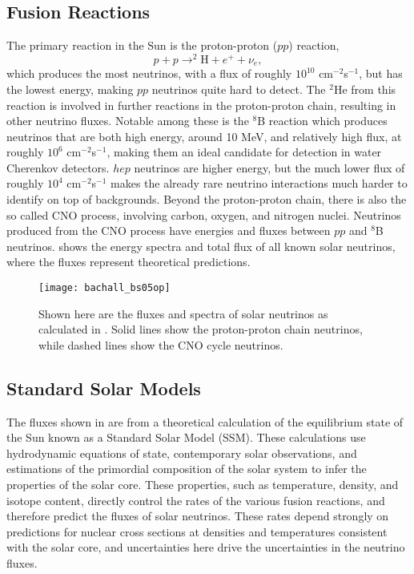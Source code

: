 \subsection{Fusion Reactions}

The primary reaction in the Sun is the proton-proton ($pp$) reaction,
\begin{equation}
p+p \rightarrow ^2\mathrm{H}+e^++\nu_e,
\end{equation}
which produces the most neutrinos, with a flux of roughly $10^10$ cm$^{-2}$s$^{-1}$, but has the lowest energy, making $pp$ neutrinos quite hard to detect.
The $^2$He from this reaction is involved in further reactions in the proton-proton chain, resulting in other neutrino fluxes.
Notable among these is the $^8$B reaction which produces neutrinos that are both high energy, around 10 MeV, and relatively high flux, at roughly $10^6$ cm$^{-2}$s$^{-1}$, making them an ideal candidate for detection in water Cherenkov detectors.
$hep$ neutrinos are higher energy, but the much lower flux of roughly $10^4$ cm$^{-2}$s$^{-1}$ makes the already rare neutrino interactions much harder to identify on top of backgrounds.
Beyond the proton-proton chain, there is also the so called CNO process, involving carbon, oxygen, and nitrogen nuclei. 
Neutrinos produced from the CNO process have energies and fluxes between $pp$ and $^8$B neutrinos.
 shows the energy spectra and total flux of all known solar neutrinos, where the fluxes represent theoretical predictions.

\begin{figure}
\centering
\texttt{[image: bachall\_bs05op]}
\caption{\label{neutrino_spectra}Shown here are the fluxes and spectra of solar neutrinos as calculated in \cite{bs05op}.
    Solid lines show the proton-proton chain neutrinos, while dashed lines show the CNO cycle neutrinos.}
\end{figure}

\subsection{Standard Solar Models}

The fluxes shown in  are from a theoretical calculation of the equilibrium state of the Sun known as a Standard Solar Model (SSM).
These calculations use hydrodynamic equations of state, contemporary solar observations, and estimations of the primordial composition of the solar system to infer the properties of the solar core.
These properties, such as temperature, density, and isotope content, directly control the rates of the various fusion reactions, and therefore predict the fluxes of solar neutrinos.
These rates depend strongly on predictions for nuclear cross sections at densities and temperatures consistent with the solar core, and uncertainties here drive the uncertainties in the neutrino fluxes.

